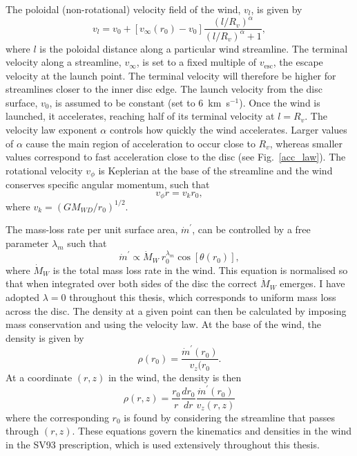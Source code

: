 The poloidal (non-rotational) velocity field of the wind, $v_l$, is given by
\begin{equation}
v_l=v_0+\left[v_{\infty}(r_0)-v_0\right]\frac{\left(l/R_v\right)^{\alpha}}{\left(l/R_v\right)^{\alpha}+1},
\label{eq:v_law}
\end{equation}
where $l$ is the poloidal distance along a particular wind
streamline. The terminal velocity along a streamline, $v_{\infty}$, is
set to a fixed multiple of $v_{\mathrm{esc}}$, the escape velocity at the launch
point. The terminal velocity will therefore be higher for streamlines closer
to the inner disc edge.
The launch velocity from the disc surface, $v_0$, is assumed to
be constant (set to $6$~km~s$^{-1}$). Once the wind is launched, it
accelerates, reaching half of its terminal velocity at $l = R_v$. The
velocity law exponent $\alpha$ controls how quickly the wind
accelerates. Larger values of $\alpha$ cause the main region of 
acceleration to occur close to $R_v$, whereas smaller values
correspond to fast acceleration close to the disc (see
Fig.~\ref{acc_law}). The rotational velocity $v_\phi$ is 
Keplerian at the base of the streamline 
and the wind conserves specific angular momentum, such that
\begin{equation}
v_\phi r = v_{k} r_0,
\label{eq:vrot}
\end{equation}
where $v_{k}=(GM_{WD}/r_0)^{1/2}$.

The mass-loss rate per unit surface area, $\dot{m}^\prime$,
can be controlled by a free parameter $\lambda_m$ such that
\begin{equation}
\dot{m}^\prime \propto \dot{M}_W~r_0^{\lambda_m} \cos [\theta(r_0)],
\label{eq:dmda}
\end{equation}
where $\dot{M}_W$ is the total mass loss rate in the wind. This equation is normalised so 
that when integrated over both sides of the disc the correct $\dot{M}_W$ emerges.
I have adopted $\lambda=0$ throughout this thesis, which corresponds to uniform
mass loss across the disc.
The density at a given point can then be calculated by imposing mass conservation
and using the velocity law. At the base of the wind, the density is 
given by
\begin{equation}
\rho (r_0) = \frac{\dot{m}^\prime(r_0)}{v_z(r_0}.
\label{eq:rho0}
\end{equation}
At a coordinate $(r,z)$ in the wind, the density is then
\begin{equation}
\rho (r, z) = \frac{r_0}{r} \frac{d r_0}{dr}\frac{\dot{m}^\prime(r_0)}{v_z(r,z)}
\label{eq:rho_rz}
\end{equation}
where the corresponding $r_0$ is found by considering the streamline that 
passes through $(r,z)$. These equations govern the kinematics
and densities in the wind in the SV93 prescription, which is used
extensively throughout this thesis. 


